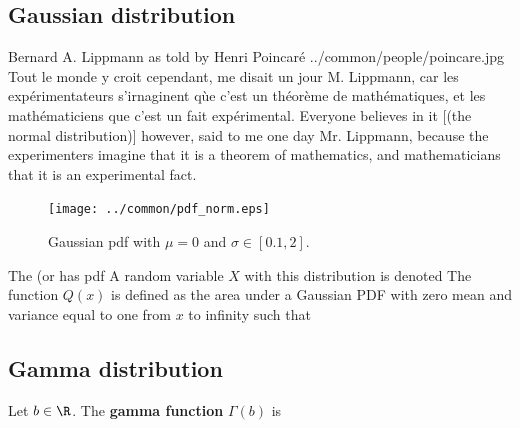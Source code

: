 \subsection{Gaussian distribution}
\qboxnpqt
  {Bernard A. Lippmann as told by Henri Poincar\'e
    
    
   \footnotemark
  }
  {../common/people/poincare.jpg}
  {Tout le monde y croit cependant, me disait un jour M. Lippmann,
   car les exp\'erimentateurs s'irnaginent q\`ue c'est un th\'eor\`eme
   de math\'ematiques, et les math\'ematiciens que c'est un fait
   exp\'erimental.}
  {Everyone believes in it [(the normal distribution)] however, 
   said to me one day Mr. Lippmann, because the experimenters imagine that 
   it is a theorem of mathematics, 
   and mathematicians that it is an experimental fact.}



\begin{figure}[ht]
   \begin{center}
   \texttt{[image: ../common/pdf\_norm.eps]} 
   \end{center}
\caption{
  Gaussian pdf with $\mu=0$ and $\sigma\in[0.1,2]$.
  \label{fig:pdf_norm}
  }
\end{figure}

\begin{definition}
The  (or  has pdf
A random variable $X$ with this distribution is denoted
The function $Q(x)$ is defined as the area under a 
Gaussian PDF with zero mean and variance equal to one
from $x$ to infinity such that
\end{definition}

\subsection{Gamma distribution}
\begin{definition}
\label{def:Gamma(b)}
Let $b\in\R$. The {\bf gamma function} $\Gamma(b)$ is
\end{definition}

